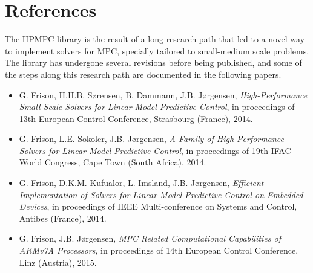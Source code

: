 \documentclass[a4paper]{report}
\begin{document}
\chapter{References}

The HPMPC library is the result of a long research path that led to a novel way to implement solvers for MPC, specially tailored to small-medium scale problems.
The library has undergone several revisions before being published, and some of the steps along this research path are documented in the following papers.
\begin{itemize}
\item G. Frison, H.H.B. S{\o}rensen, B. Dammann, J.B. J{\o}rgensen, \emph{ High-Performance Small-Scale Solvers for Linear Model Predictive Control}, in proceedings of 13th European Control Conference, Strasbourg (France), 2014.
\item G. Frison, L.E. Sokoler, J.B. J{\o}rgensen, \emph{A Family of High-Performance Solvers for Linear Model Predictive Control}, in proceedings of 19th IFAC World Congress, Cape Town (South Africa), 2014.
\item G. Frison, D.K.M. Kufualor, L. Imsland, J.B. J{\o}rgensen, \emph{Efficient Implementation of Solvers for Linear Model Predictive Control on Embedded Devices}, in proceedings of IEEE Multi-conference on Systems and Control, Antibes (France), 2014.
\item G. Frison, J.B. J{\o}rgensen, \emph{MPC Related Computational Capabilities of ARMv7A Processors}, in proceedings of 14th European Control Conference, Linz (Austria), 2015.
\end{itemize}
\end{document}
